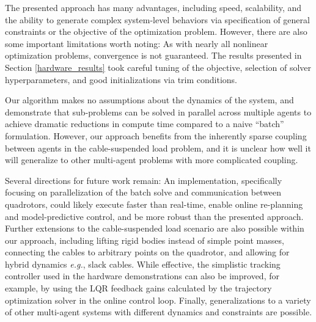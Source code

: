 \documentclass[../root.tex]{subfiles}
\begin{document}
The presented approach has many advantages, including speed, scalability, and
the ability to generate complex system-level behaviors via specification of
general constraints or the objective of the optimization problem. However,
there are also some important limitations worth noting: As with nearly all
nonlinear optimization problems, convergence is not guaranteed. The results
presented in Section \ref{hardware_results} took careful tuning of the
objective, selection of solver hyperparameters, and good initializations via
trim conditions.

Our algorithm makes no assumptions about the dynamics of the system, and
demonstrate that sub-problems can be solved in parallel across multiple
agents to achieve dramatic reductions in compute time compared to a naive
``batch'' formulation. However, our approach benefits from the inherently
sparse coupling between agents in the cable-suspended load problem, and it is
unclear how well it will generalize to other multi-agent problems with more
complicated coupling.


Several directions for future work remain: An implementation, specifically
focusing on parallelization of the batch solve and communication between
quadrotors, could likely execute faster than real-time, enable online
re-planning and model-predictive control, and be more robust than the
presented approach. Further extensions to the cable-suspended load scenario
are also possible within our approach, including lifting rigid bodies instead
of simple point masses, connecting the cables to arbitrary points on the
quadrotor, and allowing for hybrid dynamics \textit{e.g.}, slack cables.
While effective, the simplistic tracking controller used in the hardware
demonstrations can also be improved, for example, by using the LQR feedback
gains calculated by the trajectory optimization solver in the online control
loop. Finally, generalizations to a variety of other multi-agent systems with
different dynamics and constraints are possible.
\end{document}
